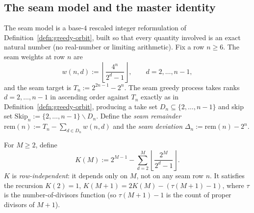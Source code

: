 \subsection{The seam model and the master identity}
\label{ssec:seam-model}

The seam model is a base-$4$ rescaled integer reformulation of Definition~\ref{defn:greedy-orbit},
built so that every quantity involved is an exact natural number (no real-number or limiting
arithmetic). Fix a row $n \ge 6$. The seam weights at row $n$ are
\[
w(n,d) := \left\lfloor \frac{4^n}{2^d-1} \right\rfloor, \qquad d = 2,\dots,n-1,
\]
and the seam target is $T_n := 2^{2n-1} - 2^n$. The seam greedy process takes ranks $d = 2,\dots,n-1$
in ascending order against $T_n$ exactly as in Definition~\ref{defn:greedy-orbit}, producing a take
set $D_n \subseteq \{2,\dots,n-1\}$ and skip set
$\mathrm{Skip}_n := \{2,\dots,n-1\} \mathbin{\backslash} D_n$.
Define the \emph{seam remainder} $\mathrm{rem}(n) := T_n - \sum_{d \in D_n} w(n,d)$ and the
\emph{seam deviation} $\Delta_n := \mathrm{rem}(n) - 2^n$.

\begin{defn}
For $M \ge 2$, define
\[
K(M) := 2^{M-1} - \sum_{d=2}^{M} \left\lfloor \frac{2^M}{2^d-1} \right\rfloor.
\]
$K$ is \emph{row-independent}: it depends only on $M$, not on any seam row $n$. It satisfies the
recursion $K(2) = 1$, $K(M+1) = 2K(M) - (\tau(M+1)-1)$, where $\tau$ is the number-of-divisors
function (so $\tau(M+1)-1$ is the count of proper divisors of $M+1$). 
 
\end{defn}

